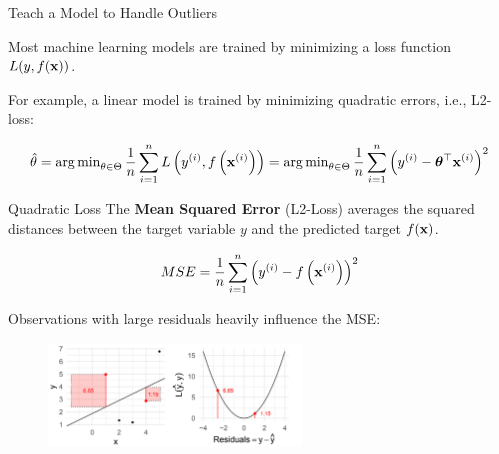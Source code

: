 \begin{vbframe}{Teach a Model to Handle Outliers}
    \vspace{+.4cm}
    
    Most machine learning models are trained by minimizing a loss function $L(y, f(\mathbf{x}))$.
    \vspace{+.4cm}
    
    For example, a linear model is trained by minimizing quadratic errors, i.e., L2-loss:
    \vspace{+.4cm}
    
    $$
        \hat{\theta} = \operatorname{arg\,min}_{\theta \in \Theta}\frac{1}{n}\sum\limits_{i = 1}^n L\left(y^{(i)}, f\left(\mathbf{x}^{(i)}\right)\right) = \operatorname{arg\,min}_{\theta \in \Theta}\frac{1}{n} \sum\limits_{i = 1}^n \left(y^{(i)} - \bm{\theta}^\top \mathbf{x}^{(i)}\right)^2
    $$
\end{vbframe}

\begin{vbframe}{Quadratic Loss}
    The \textbf{Mean Squared Error} (L2-Loss) averages the squared distances between the target variable $y$ and the predicted target $f(\mathbf{x})$.
    \vspace{+.4cm}
    
    $$
        MSE = \frac{1}{n} \sum\limits_{i=1}^n \left(y^{(i)} - f\left(\mathbf{x}^{(i)}\right) \right)^2
    $$
    \vspace{+.4cm}
    
    Observations with large residuals heavily influence the MSE:
    \medskip
    
    \begin{figure}
        \includegraphics[width = 0.6\textwidth]{figure_man/quadratic-loss.png}
    \end{figure}
    
\end{vbframe}

